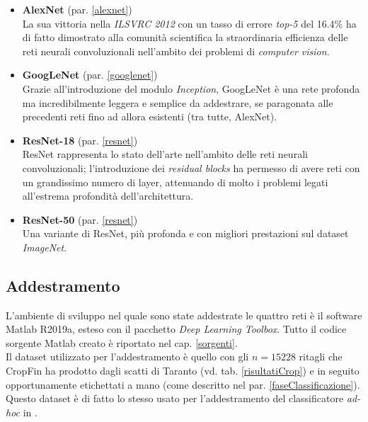 \begin{itemize}

\item \textbf{AlexNet} (par. \ref{alexnet})\\
La sua vittoria nella \textit{ILSVRC 2012} con un tasso di errore \textit{top-5} del 16.4\% ha di fatto dimostrato alla comunità scientifica la straordinaria efficienza delle reti neurali convoluzionali nell'ambito dei problemi di \textit{computer vision}.

\item \textbf{GoogLeNet} (par. \ref{googlenet})\\
Grazie all'introduzione del modulo \textit{Inception}, GoogLeNet è una rete profonda ma incredibilmente leggera e semplice da addestrare, se paragonata alle precedenti reti fino ad allora esistenti (tra tutte, AlexNet).

\item \textbf{ResNet-18} (par. \ref{resnet})\\
ResNet rappresenta lo stato dell'arte nell'ambito delle reti neurali convoluzionali; l'introduzione dei \textit{residual blocks} ha permesso di avere reti con un grandissimo numero di layer, attenuando di molto i problemi legati all'estrema profondità dell'architettura.

\item \textbf{ResNet-50} (par. \ref{resnet})\\
Una variante di ResNet, più profonda e con migliori prestazioni sul dataset \textit{ImageNet}.

\end{itemize}

\subsection{Addestramento}
\label{addestramento}
L'ambiente di sviluppo nel quale sono state addestrate le quattro reti è il software Matlab R2019a, esteso con il pacchetto \textit{Deep Learning Toolbox}. Tutto il codice sorgente Matlab creato è riportato nel cap. \ref{sorgenti}.\\

Il dataset utilizzato per l'addestramento è quello con gli $n=15228$ ritagli che CropFin ha prodotto dagli scatti di Taranto (vd. tab. \ref{risultatiCrop}) e in seguito opportunamente etichettati a mano (come descritto nel par. \ref{faseClassificazione}). Questo dataset è di fatto lo stesso usato per l'addestramento del classificatore \textit{ad-hoc} in \cite{gianvito}.

